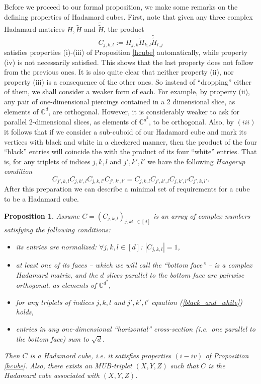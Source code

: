 \documentclass[12pt]{amsart}
\numberwithin{equation}{section}
\newtheorem{proposition}[fact]{Proposition}
\theoremstyle{definition}
\theoremstyle{remark}
\theoremstyle{remark}
\begin{document}
Before we proceed to our formal proposition, we make some remarks on the defining properties of Hadamard cubes. First, note that given any three complex Hadamard matrices $H,\tilde{H}$ and $\tilde{\tilde{H}}$, the product 
\begin{equation}\label{gencube}
C_{j,k,l}:= H_{j,k} \tilde{H}_{k,l}
\tilde{\tilde{H}}_{l,j}
\end{equation}
satisfies  properties (i)-(iii) of Proposition \ref{hcube} automatically, while property (iv) is not necessarily satisfied. This shows that the last property does not follow from the previous ones. It is also quite clear that neither property (ii), nor property (iii) is a consequence of the other ones. So instead of ``dropping'' either of them, 
we shall consider a weaker form of 
each. For example, by property (ii), any pair of one-dimensional piercings contained in a 2 dimensional slice, as elements of $\mathbb C^d$, are orthogonal. However, it is considerably weaker to ask for parallel 2-dimensional slices, as elements of $\mathbb C^{d^2}$, to be orthogonal.
Also, by $(iii)$ it 
follows that if we consider a 
sub-cuboid of our Hadamard cube and mark its vertices with black and white in a checkered manner, then the product of the four ``black'' entries will coincide the with the product of its four ``white'' entries. That is, for any triplets of indices $j,k,l$ and $j',k',l'$
we have the following {\it Haagerup condition}
\begin{equation}
\label{black_and_white}
C_{j',k,l} C_{j,k',l} C_{j,k,l'} C_{j',k',l'} = C_{j,k,l} C_{j',k',l} C_{j,k',l'} C_{j',k,l'}.
\end{equation}
After this preparation we can describe a minimal set of requirements for a cube to be a Hadamard cube. 

\begin{proposition}\label{misi}
Assume $C=(C_{j,k,l})_{j,kl,\in [d]}$ is an array of complex numbers satisfying the following conditions:
\begin{itemize}
 \item[i')] its entries are normalized: $\forall j,k,l\in[d]$: $|C_{j,k,l}|=1$,
\item[ii')] at least one of its faces -- which we will call the ``bottom face'' -- is a complex Hadamard matrix, and the $d$ slices parallel to the bottom face are pairwise orthogonal, as elements of $\mathbb C^{d^2}$, 
\item[iii')] for any triplets of
indices $j,k,l$ and $j',k',l'$ equation (\ref{black_and_white}) holds,
\item[iv')]
entries in any one-dimensional ``horizontal'' cross-section (i.e.\ one parallel to the bottom face) 
sum to $\sqrt{d}$.
\end{itemize}
Then $C$ is a Hadamard cube, i.e. it satisfies properties $(i-iv)$ of Proposition \ref{hcube}. Also, there exists an MUB-triplet $(X, Y, Z)$ such that $C$ is the Hadamard cube associated with $(X, Y, Z)$.
\end{proposition} 
\end{document}
